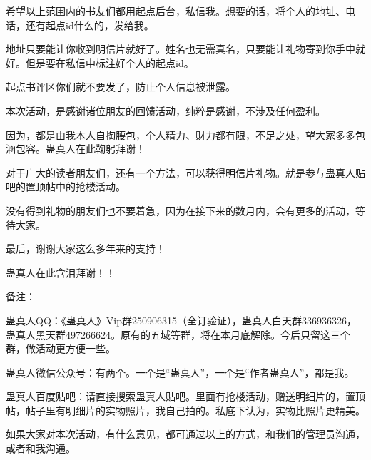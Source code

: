 \begin{this_body}
希望以上范围内的书友们都用起点后台，私信我。想要的话，将个人的地址、电话，还有起点id什么的，发给我。

地址只要能让你收到明信片就好了。姓名也无需真名，只要能让礼物寄到你手中就好。但是要在私信中标注好个人的起点id。

起点书评区你们就不要发了，防止个人信息被泄露。

本次活动，是感谢诸位朋友的回馈活动，纯粹是感谢，不涉及任何盈利。

因为，都是由我本人自掏腰包，个人精力、财力都有限，不足之处，望大家多多包涵包容。蛊真人在此鞠躬拜谢！

对于广大的读者朋友们，还有一个方法，可以获得明信片礼物。就是参与蛊真人贴吧的置顶帖中的抢楼活动。

没有得到礼物的朋友们也不要着急，因为在接下来的数月内，会有更多的活动，等待大家。

最后，谢谢大家这么多年来的支持！

蛊真人在此含泪拜谢！！

备注：

蛊真人QQ：《蛊真人》Vip群250906315（全订验证），蛊真人白天群336936326，蛊真人黑天群497266624。原有的五域等群，将在本月底解除。今后只留这三个群，做活动更方便一些。

蛊真人微信公众号：有两个。一个是“蛊真人”，一个是“作者蛊真人”，都是我。

蛊真人百度贴吧：请直接搜索蛊真人贴吧。里面有抢楼活动，赠送明细片的，置顶帖，帖子里有明细片的实物照片，我自己拍的。私底下认为，实物比照片更精美。

如果大家对本次活动，有什么意见，都可通过以上的方式，和我们的管理员沟通，或者和我沟通。

\end{this_body}


